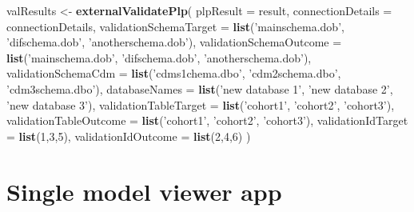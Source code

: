 \documentclass[11pt]{book}
\newenvironment{Shaded}{\begin{snugshade}}{\end{snugshade}}
\newcommand{\DataTypeTok}[1]{\textcolor[rgb]{0.13,0.29,0.53}{#1}}
\newcommand{\DecValTok}[1]{\textcolor[rgb]{0.00,0.00,0.81}{#1}}
\newcommand{\KeywordTok}[1]{\textcolor[rgb]{0.13,0.29,0.53}{\textbf{#1}}}
\newcommand{\NormalTok}[1]{#1}
\newcommand{\StringTok}[1]{\textcolor[rgb]{0.31,0.60,0.02}{#1}}
\theoremstyle{definition}
\theoremstyle{definition}
\theoremstyle{definition}
\theoremstyle{remark}
\begin{document}
\begin{Shaded}
\begin{Highlighting}[]
\NormalTok{valResults <-}\StringTok{ }\KeywordTok{externalValidatePlp}\NormalTok{(}
    \DataTypeTok{plpResult =}\NormalTok{ result, }
    \DataTypeTok{connectionDetails =}\NormalTok{ connectionDetails,}
    \DataTypeTok{validationSchemaTarget =} \KeywordTok{list}\NormalTok{(}\StringTok{'mainschema.dob'}\NormalTok{,}
                                \StringTok{'difschema.dob'}\NormalTok{, }
                                \StringTok{'anotherschema.dob'}\NormalTok{),}
    \DataTypeTok{validationSchemaOutcome =} \KeywordTok{list}\NormalTok{(}\StringTok{'mainschema.dob'}\NormalTok{,}
                                 \StringTok{'difschema.dob'}\NormalTok{, }
                                 \StringTok{'anotherschema.dob'}\NormalTok{),}
    \DataTypeTok{validationSchemaCdm =} \KeywordTok{list}\NormalTok{(}\StringTok{'cdms1chema.dbo'}\NormalTok{,}
                             \StringTok{'cdm2schema.dbo'}\NormalTok{,}
                             \StringTok{'cdm3schema.dbo'}\NormalTok{),}
    \DataTypeTok{databaseNames =} \KeywordTok{list}\NormalTok{(}\StringTok{'new database 1'}\NormalTok{,}
                       \StringTok{'new database 2'}\NormalTok{,}
                       \StringTok{'new database 3'}\NormalTok{),}
    \DataTypeTok{validationTableTarget =} \KeywordTok{list}\NormalTok{(}\StringTok{'cohort1'}\NormalTok{,}
                               \StringTok{'cohort2'}\NormalTok{,}
                               \StringTok{'cohort3'}\NormalTok{),}
    \DataTypeTok{validationTableOutcome =} \KeywordTok{list}\NormalTok{(}\StringTok{'cohort1'}\NormalTok{,}
                                \StringTok{'cohort2'}\NormalTok{,}
                                \StringTok{'cohort3'}\NormalTok{),}
    \DataTypeTok{validationIdTarget =} \KeywordTok{list}\NormalTok{(}\DecValTok{1}\NormalTok{,}\DecValTok{3}\NormalTok{,}\DecValTok{5}\NormalTok{),}
    \DataTypeTok{validationIdOutcome =} \KeywordTok{list}\NormalTok{(}\DecValTok{2}\NormalTok{,}\DecValTok{4}\NormalTok{,}\DecValTok{6}\NormalTok{)}
\NormalTok{)}
\end{Highlighting}
\end{Shaded}

\hypertarget{single-model-viewer-app}{%
\section{Single model viewer app}\label{single-model-viewer-app}}
\end{document}
